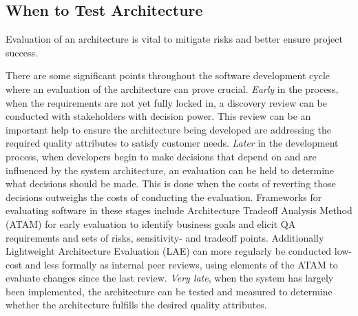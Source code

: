 




\subsection{When to Test Architecture} 
Evaluation of an architecture is vital to mitigate risks and better ensure project success.

There are some significant points throughout the software development cycle where an evaluation of the architecture can prove crucial. \textit{Early} in the process, when the requirements are not yet fully locked in, a discovery review can be conducted with stakeholders with decision power. This review can be an important help to ensure the architecture being developed are addressing the required quality attributes to satisfy customer needs. \textit{Later} in the development process, when developers begin to make decisions that depend on and are influenced by the system architecture, an evaluation can be held to determine what decisions should be made. This is done when the costs of reverting those decisions outweighs the costs of conducting the evaluation. 
Frameworks for evaluating software in these stages include Architecture Tradeoff Analysis Method (ATAM) for early evaluation to identify business goals and elicit QA requirements and sets of risks, sensitivity- and tradeoff points. Additionally Lightweight Architecture Evaluation (LAE) can more regularly be conducted low-cost and less formally as internal peer reviews, using elements of the ATAM to evaluate changes since the last review.
\textit{Very late}, when the system has largely been implemented, the architecture can be tested and measured to determine whether the architecture fulfills the desired quality attributes. \cite{WormKangLec72024}




